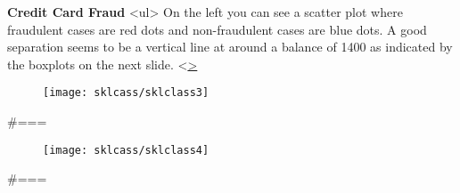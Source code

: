   


\textbf{Credit Card Fraud}
<ul>
 On the left you can see a scatter plot where fraudulent cases are red dots and non-fraudulent cases are blue dots. 
 A good separation seems to be a vertical line at around a balance of 1400 as indicated by the boxplots on the next slide.
<\ul>




  


\begin{figure}
\centering
\texttt{[image: sklcass/sklclass3]}

\end{figure}




 #===
\begin{figure}
\centering
\texttt{[image: sklcass/sklclass4]}
\end{figure}
 #===
